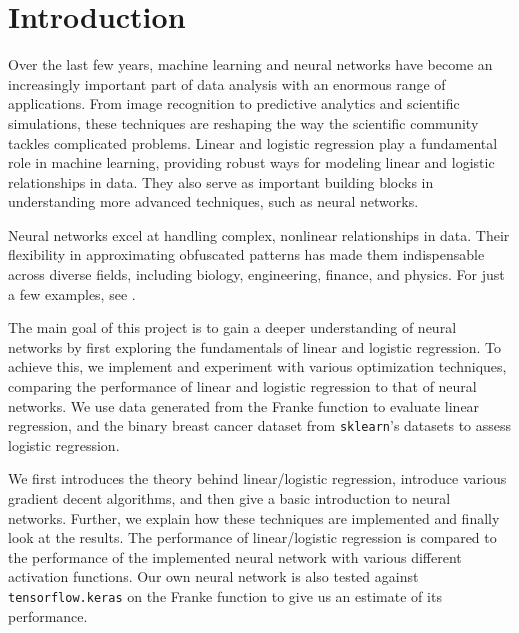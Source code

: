 \documentclass[%
reprint,s
amsmath,amssymb,
aps,
]{revtex4-2}
\begin{document}
\section{Introduction}
Over the last few years, machine learning and neural networks have become an increasingly important part of data analysis with an enormous range of applications. From image recognition to predictive analytics and scientific simulations, these techniques are reshaping the way the scientific community tackles complicated problems. Linear and logistic regression play a fundamental role in machine learning, providing robust ways for modeling linear and logistic relationships in data. They also serve as important building blocks in understanding more advanced techniques, such as neural networks. 

Neural networks excel at handling complex, nonlinear relationships in data. Their flexibility in approximating obfuscated patterns has made them indispensable across diverse fields, including biology, engineering, finance, and physics. For just a few examples, see \cite{dawid2023modernapplicationsmachinelearning,thapar2023applicationsmachinelearningmodelling,mohammadi2022applicationsmachinelearninghealthcare}.

The main goal of this project is to gain a deeper understanding of neural networks by first exploring the fundamentals of linear and logistic regression. To achieve this, we implement and experiment with various optimization techniques, comparing the performance of linear and logistic regression to that of neural networks. We use data generated from the Franke function to evaluate linear regression, and the binary breast cancer dataset from \texttt{sklearn}'s datasets \cite{sklearn} to assess logistic regression. 

We first introduces the theory behind linear/logistic regression, introduce various gradient decent algorithms, and then give a basic introduction to neural networks. Further, we explain how these techniques are implemented and finally look at the results. The performance of linear/logistic regression is compared to the performance of the implemented neural network with various different activation functions. Our own neural network is also tested against \texttt{tensorflow.keras} \cite{tensorflow2015-whitepaper} on the Franke function to give us an estimate of its performance.
\end{document}
